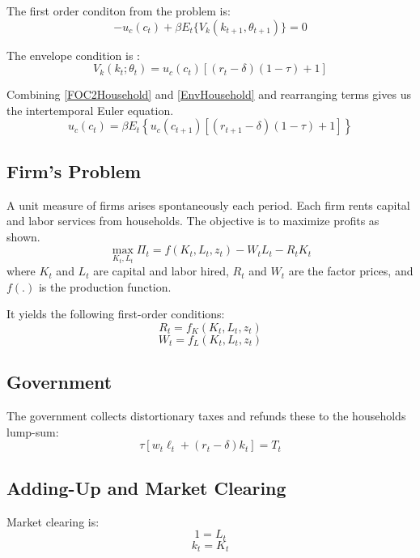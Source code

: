 \documentclass[letterpaper,12pt]{article}
\theoremstyle{definition}
\begin{document}
\begin{spacing}{1.5}
		The first order conditon from the problem is:
		\begin{equation}\label{FOC2Household}
		 -u_c(c_t) + \beta E_t\{V_k(k_{t+1},\theta_{t+1})\} = 0
		\end{equation}

		The envelope condition is :
		\begin{equation}\label{EnvHousehold}
		V_k(k_t;\theta_t) = u_c(c_t)[(r_t-\delta)(1-\tau)+1]
		\end{equation}

		Combining \eqref{FOC2Household} and \eqref{EnvHousehold} and rearranging terms gives us the intertemporal Euler equation.
		\begin{equation}\label{Euler2Household}
		u_c(c_t) = \beta E_t\left\{ u_c(c_{t+1})[(r_{t+1}-\delta)(1-\tau)+1] \right\}
		\end{equation}

	\subsection{Firm's Problem}
		A unit measure of firms arises spontaneously each period. Each firm rents capital and labor services from households. The objective is to maximize profits as shown.
		\begin{equation}
		\max_{K_t,L_t} \Pi_t = f(K_t,L_t,z_t) - W_tL_t-R_tK_t \nonumber
		\end{equation}
		where $K_t$ and $L_t$ are capital and labor hired, $R_t$ and $W_t$ are the factor prices, and $f(.)$ is the production function.

		It yields the following first-order conditions:
		\begin{equation}
		R_t = f_K(K_t,L_t,z_t)
		\end{equation}
		\begin{equation}
		W_t = f_L(K_t,L_t,z_t)
		\end{equation}

	\subsection{Government}
		The government collects distortionary taxes and refunds these to the households lump-sum:
		\begin{equation}\label{GovtBC2Firm}
		\tau \left[w_t\ell_t+(r_t-\delta)k_t\right] = T_t
		\end{equation}

		\subsection{Adding-Up and Market Clearing}
		Market clearing is:
		\begin{equation}\label{LAdd}
		1 = L_t
		\end{equation}
		\begin{equation}\label{KAdd}
		k_t = K_t
		\end{equation}


\end{spacing}
\end{document}
